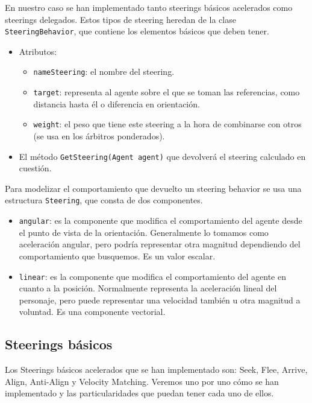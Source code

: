 En nuestro caso se han implementado tanto steerings básicos acelerados como steerings delegados. Estos tipos de steering heredan de la clase \texttt{SteeringBehavior}, que contiene los elementos básicos que deben tener.

\begin{itemize}
    \item Atributos:
    \begin{itemize}
        \item \texttt{nameSteering}: el nombre del steering.
        \item \texttt{target}: representa al agente sobre el que se toman las referencias, como distancia hasta él o diferencia en orientación.
        \item \texttt{weight}: el peso que tiene este steering a la hora de combinarse con otros (se usa en los árbitros ponderados). 
    \end{itemize}
    \item El método \texttt{GetSteering(Agent agent)} que devolverá el steering calculado en cuestión.
\end{itemize}

Para modelizar el comportamiento que devuelto un steering behavior se usa una estructura \texttt{Steering}, que consta de dos componentes.

\begin{itemize}
    \item \texttt{angular}: es la componente que modifica el comportamiento del agente desde el punto de vista de la orientación. Generalmente lo tomamos como aceleración angular, pero podría representar otra magnitud dependiendo del comportamiento que busquemos. Es un valor escalar.
    \item \texttt{linear}: es la componente que modifica el comportamiento del agente en cuanto a la posición. Normalmente representa la aceleración lineal del personaje, pero puede representar una velocidad también u otra magnitud a voluntad. Es una componente vectorial.
\end{itemize}

\subsection{Steerings básicos}

Los Steerings básicos acelerados que se han implementado son: Seek, Flee, Arrive, Align, Anti-Align y Velocity Matching. Veremos uno por uno cómo se han implementado y las particularidades que puedan tener cada uno de ellos.














